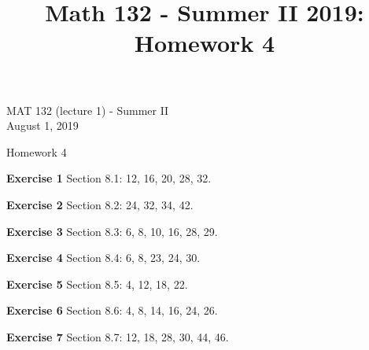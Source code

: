 \documentclass[12pt,oneside]{exam}
\title{Math 132 - Summer II 2019: Homework 4}
\newenvironment{exercise}[1]{\vspace{.1in}\noindent\textbf{Exercise #1 \hspace{.05em}}}{}
\begin{document}
\begin{flushright}
\sc MAT 132 (lecture 1) - Summer II\\

August 1, 2019
\end{flushright}
\bigskip

\begin{center}
\textsf{Homework 4} 
\end{center}


\begin{exercise}{1}
Section 8.1: 12, 16, 20, 28, 32.
\end{exercise}

\begin{exercise}{2}
Section 8.2: 24, 32, 34, 42.
\end{exercise}

\begin{exercise}{3} 
Section 8.3: 6, 8, 10, 16, 28, 29.
\end{exercise}

\begin{exercise}{4}
Section 8.4: 6, 8, 23, 24, 30.
\end{exercise}

\begin{exercise}{5}
Section 8.5: 4, 12, 18, 22.
\end{exercise}

\begin{exercise}{6}
Section 8.6: 4, 8, 14, 16, 24, 26.
\end{exercise}

\begin{exercise}{7}
Section 8.7: 12, 18, 28, 30, 44, 46.
\end{exercise}
\end{document}

